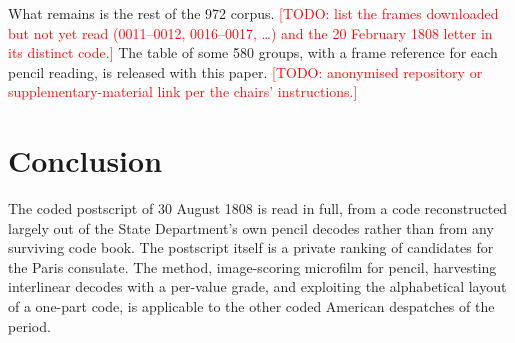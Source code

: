 \documentclass[11pt]{article}
\newcommand{\todo}[1]{\textcolor{red}{[TODO: #1]}}
\begin{document}
What remains is the rest of the 972 corpus. \todo{list the frames downloaded but not yet read (0011--0012, 0016--0017, \ldots) and the 20 February 1808 letter in its distinct code.} The table of some 580 groups, with a frame reference for each pencil reading, is released with this paper. \todo{anonymised repository or supplementary-material link per the chairs' instructions.}

\section{Conclusion}

The coded postscript of 30 August 1808 is read in full, from a code reconstructed largely out of the State Department's own pencil decodes rather than from any surviving code book. The postscript itself is a private ranking of candidates for the Paris consulate. The method, image-scoring microfilm for pencil, harvesting interlinear decodes with a per-value grade, and exploiting the alphabetical layout of a one-part code, is applicable to the other coded American despatches of the period.




\end{document}
